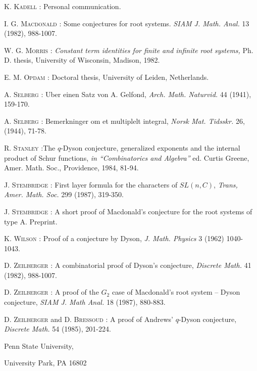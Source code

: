\begin{thebibliography}{99}
 \textsc{K. Kadell} : Personal communication.

 \textsc{I. G. Macdonald} :  Some conjectures for root systems. \textit{SIAM J.  Math. Anal.} 13 (1982), 988-1007.

 \textsc{W. G. Morris} : \textit{Constant term identities for finite and infinite root systems,} Ph. D. thesis, University of Wisconsin, Madison, 1982.

 \textsc{E. M. Opdam} : Doctoral thesis, University of Leiden, Netherlands.

 \textsc{A. Selberg} : Uber einen Satz von A. Gelfond, \textit{Arch. Math. Naturvid.} 44 (1941), 159-170.

 \textsc{A. Selberg} : Bemerkninger om et multiplelt integral, \textit{Norsk Mat. Tidsskr.} 26, (1944), 71-78.

 \textsc{R. Stanley} :\pageoriginale The $q$-Dyson conjecture, generalized exponents and the internal product of Schur functions, \textit{in ``Combinatorics and Algebra''} ed. Curtis Greene, Amer. Math. Soc., Providence, 1984, 81-94.

 \textsc{J. Stembridge} : First layer formula for the characters of $SL (n, C)$, \textit{Trans, Amer. Math. Soc.} 299 (1987), 319-350.

 \textsc{J. Stembridge} : A short proof of Macdonald's conjecture for the root systems of type A. Preprint.

 \textsc{K. Wilson} : Proof of a conjecture by Dyson, \textit{J. Math. Physics} 3 (1962) 1040-1043.

 \textsc{D. Zeilberger} : A combinatorial proof of Dyson's conjecture, \textit{Discrete Math.} 41 (1982), 988-1007.

 \textsc{D. Zeilberger} : A proof of the $G_2$ case of Macdonald's root system -- Dyson conjecture, \textit{SIAM J. Math Anal.} 18 (1987), 880-883.

 \textsc{D. Zeilberger} and \textsc{D. Bressoud} : A proof of Andrews' $q$-Dyson conjecture, \textit{Discrete Math.} 54 (1985), 201-224.
\end{thebibliography}

\medskip
\noindent
{\small Penn State University,}


\noindent
{\small University Park, PA 16802}

